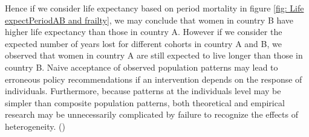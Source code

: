 Hence if we consider life  expectancy based on period mortality in figure \ref{fig: Life expectPeriodAB and frailty}, we may conclude that women in country B have higher life expectancy than those in country A. However if we consider the expected number of years lost for different cohorts in country A and B, we observed that women in country A are still expected to live longer than those in country B. 
Naive acceptance of observed population patterns may lead to erroneous policy recommendations if an intervention depends on the response of individuals. 
Furthermore, because patterns at the individuals level may be simpler than composite population patterns, both theoretical and empirical research may be unnecessarily complicated by failure to recognize the effects of heterogeneity.
(\cite{VA85})














